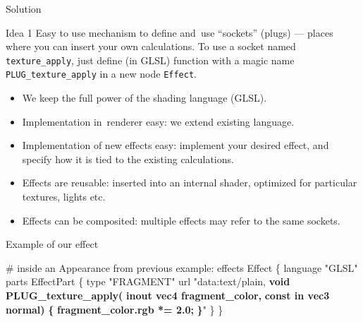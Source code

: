 \documentclass{beamer}
\begin{document}
\begin{frame}{Solution}

\begin{block}{Idea 1}
Easy to use mechanism to define and~use
``sockets'' (plugs) --- places where you can insert your own calculations.
To use a socket named \texttt{texture\_apply},
just define (in GLSL) function with a magic name \texttt{PLUG\_texture\_apply}
in a new node \texttt{Effect}.
\end{block}

\begin{itemize}
  \item We keep the full power of the shading language (GLSL).
  \item Implementation in~renderer easy: we extend existing language.
  \item Implementation of new effects easy: implement
    your desired effect, and specify how it is tied to the existing
    calculations.
  \item Effects are reusable: inserted into an internal shader,
    optimized for particular textures, lights etc.
  \item Effects can be composited: multiple effects may refer to the same sockets.
\end{itemize}
\end{frame}

\begin{frame}[fragile]
\begin{exampleblock}{Example of our effect}
\begin{semiverbatim}
\# inside an Appearance from previous example:
effects Effect \{
  language "GLSL"
  parts EffectPart \{
    type "FRAGMENT"
    url "data:text/plain,
\textbf{    void PLUG\_texture\_apply(}
\textbf{      inout vec4 fragment\_color,}
\textbf{      const in vec3 normal)}
\textbf{    \{}
\textbf{      fragment\_color.rgb *= 2.0;}
\textbf{    \}}"
  \}
\}
\end{semiverbatim}
\end{exampleblock}
\end{frame}

\end{document}
